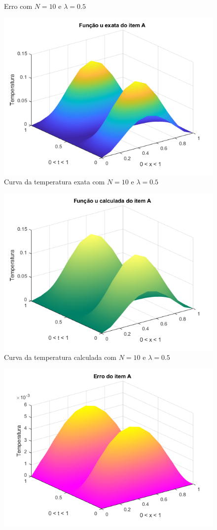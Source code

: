 \documentclass[12pt]{article}
\begin{document}
\begin{spacing}{1.5}
\begin{figure}
    \caption{Erro com $N=10$ e $\lambda=0.5$}
    \label{fig:A_n10lambda0-25_erro}
\end{figure}
\begin{figure}
    \centering
    \includegraphics[width=0.8\linewidth]{Primeira_Tarefa/ItemA/n10_lambda0-5_exata.png}
    \caption{Curva da temperatura exata com $N=10$ e $\lambda=0.5$}
    \label{fig:A_n10lambda0-5_exata}
\end{figure}
\begin{figure}
    \centering
    \includegraphics[width=0.8\linewidth]{Primeira_Tarefa/ItemA/n10_lambda0-5_calc.png}
    \caption{Curva da temperatura calculada com $N=10$ e $\lambda=0.5$}
    \label{fig:A_n10lambda0-5_calc}
\end{figure}
\begin{figure}
    \centering
    \includegraphics[width=0.8\linewidth]{Primeira_Tarefa/ItemA/n10_lambda0-5_erro.png}

\end{figure}
\end{spacing}
\end{document}
